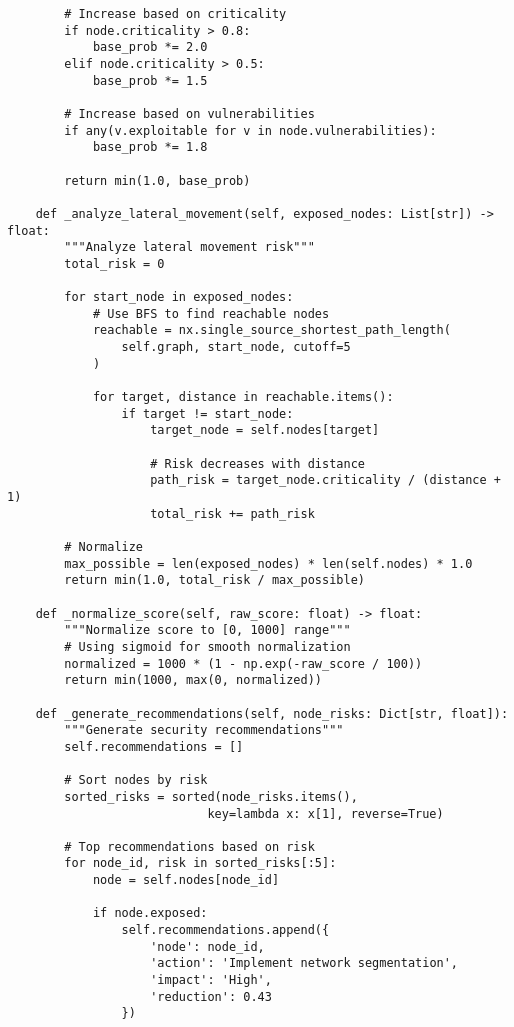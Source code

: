 \begin{verbatim}
        # Increase based on criticality
        if node.criticality > 0.8:
            base_prob *= 2.0
        elif node.criticality > 0.5:
            base_prob *= 1.5
        
        # Increase based on vulnerabilities
        if any(v.exploitable for v in node.vulnerabilities):
            base_prob *= 1.8
        
        return min(1.0, base_prob)
    
    def _analyze_lateral_movement(self, exposed_nodes: List[str]) -> float:
        """Analyze lateral movement risk"""
        total_risk = 0
        
        for start_node in exposed_nodes:
            # Use BFS to find reachable nodes
            reachable = nx.single_source_shortest_path_length(
                self.graph, start_node, cutoff=5
            )
            
            for target, distance in reachable.items():
                if target != start_node:
                    target_node = self.nodes[target]
                    
                    # Risk decreases with distance
                    path_risk = target_node.criticality / (distance + 1)
                    total_risk += path_risk
        
        # Normalize
        max_possible = len(exposed_nodes) * len(self.nodes) * 1.0
        return min(1.0, total_risk / max_possible)
    
    def _normalize_score(self, raw_score: float) -> float:
        """Normalize score to [0, 1000] range"""
        # Using sigmoid for smooth normalization
        normalized = 1000 * (1 - np.exp(-raw_score / 100))
        return min(1000, max(0, normalized))
    
    def _generate_recommendations(self, node_risks: Dict[str, float]):
        """Generate security recommendations"""
        self.recommendations = []
        
        # Sort nodes by risk
        sorted_risks = sorted(node_risks.items(), 
                            key=lambda x: x[1], reverse=True)
        
        # Top recommendations based on risk
        for node_id, risk in sorted_risks[:5]:
            node = self.nodes[node_id]
            
            if node.exposed:
                self.recommendations.append({
                    'node': node_id,
                    'action': 'Implement network segmentation',
                    'impact': 'High',
                    'reduction': 0.43
                })
            

\end{verbatim}
